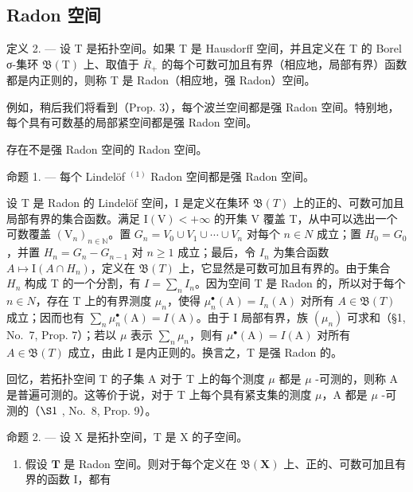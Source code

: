 \subsection{Radon 空间}

定义 2. --- 设 T 是拓扑空间。如果 T 是 Hausdorff 空间，并且定义在 T 的 Borel σ-集环 \(\mathfrak{B}(\mathrm{T})\) 上、取值于 \(\overline{R}_{+}\) 的每个可数可加且有界（相应地，局部有界）函数都是内正则的，则称 T 是 Radon（相应地，强 Radon）空间。

例如，稍后我们将看到（Prop. 3），每个波兰空间都是强 Radon 空间。特别地，每个具有可数基的局部紧空间都是强 Radon 空间。

存在不是强 Radon 空间的 Radon 空间。

命题 1. --- 每个 Lindelöf \(^{(1)}\) Radon 空间都是强 Radon 空间。

设 T 是 Radon 的 Lindelöf 空间，I 是定义在集环 \(\mathfrak{B}(T)\) 上的正的、可数可加且局部有界的集合函数。满足 \(\mathrm{I}(\mathrm{V}) < +\infty\) 的开集 V 覆盖 T，从中可以选出一个可数覆盖 \((\mathrm{V}_{n})_{n \in \mathbb{N}}\)。置 \(G_{n} = V_{0} \cup V_{1} \cup \cdots \cup V_{n}\) 对每个 \(n \in N\) 成立；置 \(H_{0} = G_{0}\)，并置 \(H_{n} = G_{n} - G_{n-1}\) 对 \(n \geqslant 1\) 成立；最后，令 \(I_{n}\) 为集合函数 \(A \mapsto \mathrm{I}(A \cap H_{n})\)，定义在 \(\mathfrak{B}(T)\) 上，它显然是可数可加且有界的。由于集合 \(H_{n}\) 构成 T 的一个分割，有 \(I = \sum_{n} I_{n}\)。因为空间 T 是 Radon 的，所以对于每个 \(n \in N\)，存在 T 上的有界测度 \(\mu_{n}\)，使得 \(\mu_{n}^{\bullet}(\mathrm{A}) = I_{n}(\mathrm{A})\) 对所有 \(A \in \mathfrak{B}(T)\) 成立；因而也有 \(\sum_{n} \mu_{n}^{\bullet}(\mathrm{A}) = I(\mathrm{A})\)。由于 I 局部有界，族 \((\mu_{n})\) 可求和（§1, No.~7, Prop. 7）；若以 \(\mu\) 表示 \(\sum_{n} \mu_{n}\)，则有 \(\mu^{\bullet}(\mathrm{A}) = I(\mathrm{A})\) 对所有 \(A \in \mathfrak{B}(T)\) 成立，由此 I 是内正则的。换言之，T 是强 Radon 的。

回忆，若拓扑空间 T 的子集 A 对于 T 上的每个测度 \(\mu\) 都是 \(\mu\) -可测的，则称 A 是普遍可测的。这等价于说，对于 T 上每个具有紧支集的测度 \(\mu\)，A 都是 \(\mu\) -可测的（\(\S1\) , No.~8, Prop. 9）。

命题 2. --- 设 X 是拓扑空间，T 是 X 的子空间。

\begin{enumerate}
\def\labelenumi{\alph{enumi})}
\tightlist
\item
  假设 \(\mathbf{T}\) 是 Radon 空间。则对于每个定义在 \(\mathfrak{B}(\mathbf{X})\) 上、正的、可数可加且有界的函数 I，都有
\end{enumerate}

